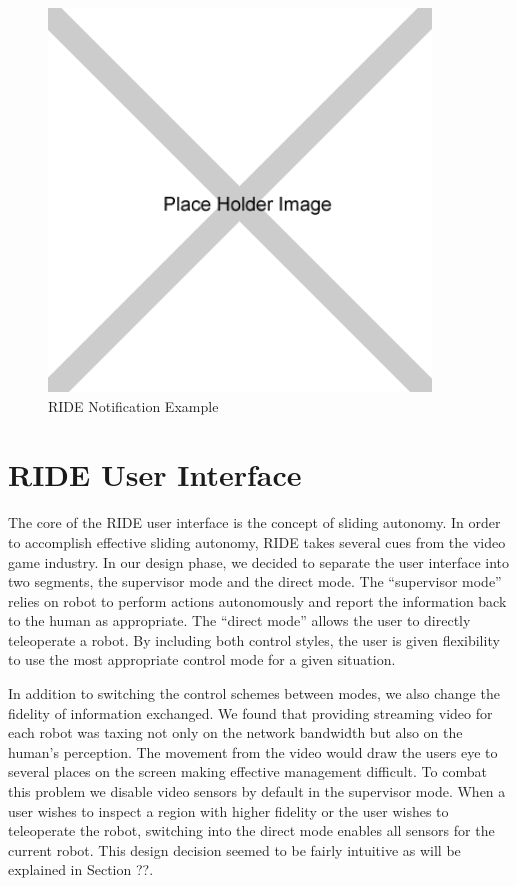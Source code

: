 \begin{figure}[ht]
\begin{center}
\includegraphics[width=4.0in]{images/placeholder.png}
\caption{RIDE Notification Example\label{fig:ride-notification}}
\end{center}
\end{figure}

\section{RIDE User Interface}

The core of the RIDE user interface is the concept of sliding autonomy. In order to accomplish effective sliding autonomy, RIDE takes several cues from the video game industry. In our design phase, we decided to separate the user interface into two segments, the supervisor mode and the direct mode. The ``supervisor mode'' relies on robot to perform actions autonomously and report the information back to the human as appropriate. The ``direct mode'' allows the user to directly teleoperate a robot. By including both control styles, the user is given flexibility to use the most appropriate control mode for a given situation.

In addition to switching the control schemes between modes, we also change the fidelity of information exchanged. We found that providing streaming video for each robot was taxing not only on the network bandwidth but also on the human's perception. The movement from the video would draw the users eye to several places on the screen making effective management difficult. To combat this problem we disable video sensors by default in the supervisor mode. When a user wishes to inspect a region with higher fidelity or the user wishes to teleoperate the robot, switching into the direct mode enables all sensors for the current robot. This design decision seemed to be fairly intuitive as will be explained in Section ??.

